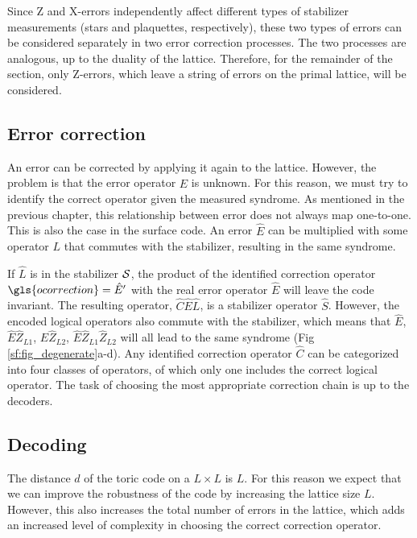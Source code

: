 Since Z and X-errors independently affect different types of stabilizer measurements (stars and plaquettes, respectively), these two types of errors can be considered separately in two error correction processes. The two processes are analogous, up to the duality of the lattice. Therefore, for the remainder of the section, only Z-errors, which leave a string of errors on the primal lattice, will be considered.


\subsection{Error correction}\label{sec:correction}
An error can be corrected by applying it again to the lattice. However, the problem is that the error operator $\hat{E}$ is unknown. For this reason, we must try to identify the correct operator given the measured syndrome. As mentioned in the previous chapter, this relationship between error does not always map one-to-one. This is also the case in the surface code. An error $\hat{E}$ can be multiplied with some operator $L$ that commutes with the stabilizer, resulting in the same syndrome.

If $\hat{L}$ is in the stabilizer $\mathcal{S}$, the product of the identified correction operator $\gls{ocorrection}=\hat{E}'$ with the real error operator $\hat{E}$ will leave the code invariant. The resulting operator, $\hat{C}\hat{E}\hat{L}$, is a stabilizer operator $\hat{S}$. However, the encoded logical operators also commute with the stabilizer, which means that $\hat{E}$, $\hat{E}\hat{Z}_{L1}$, $\hat{E}\hat{Z}_{L2}$, $\hat{E}\hat{Z}_{L1}\hat{Z}_{L2}$ will all lead to the same syndrome (Fig \ref{sf:fig_degenerate}a-d). Any identified correction operator $\hat{C}$ can be categorized into four classes of operators, of which only one includes the correct logical operator. The task of choosing the most appropriate correction chain is up to the decoders.

\subsection{Decoding}\label{sec:threshold}
The distance $d$ of the toric code on a $L\times L$ is $L$. For this reason we expect that we can improve the robustness of the code by increasing the lattice size $L$. However, this also increases the total number of errors in the lattice, which adds an increased level of complexity in choosing the correct correction operator.

